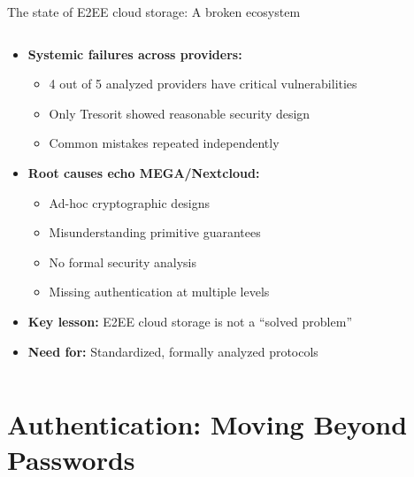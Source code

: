 \documentclass[aspectratio=169, lualatex, handout]{beamer}
\begin{document}
\begin{frame}{The state of E2EE cloud storage: A broken ecosystem}
	\begin{columns}[c]
		\begin{column}{1\textwidth}
			\begin{itemize}
				\item \textbf{Systemic failures across providers:}
				      \begin{itemize}
					      \item 4 out of 5 analyzed providers have critical vulnerabilities
					      \item Only Tresorit showed reasonable security design
					      \item Common mistakes repeated independently
				      \end{itemize}
				\item \textbf{Root causes echo MEGA/Nextcloud:}
				      \begin{itemize}
					      \item Ad-hoc cryptographic designs
					      \item Misunderstanding primitive guarantees
					      \item No formal security analysis
					      \item Missing authentication at multiple levels
				      \end{itemize}
				\item \textbf{Key lesson:} E2EE cloud storage is not a ``solved problem''
				\item \textbf{Need for:} Standardized, formally analyzed protocols
			\end{itemize}
		\end{column}
	\end{columns}
\end{frame}

\section{Authentication: Moving Beyond Passwords}
\end{document}
